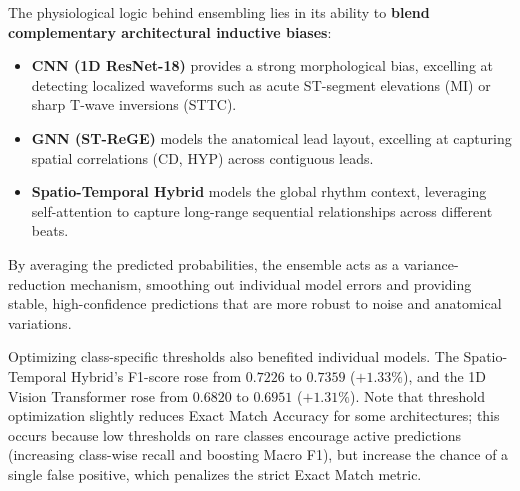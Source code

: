\documentclass[12pt,a4paper]{report}
\begin{document}
The physiological logic behind ensembling lies in its ability to \textbf{blend complementary architectural inductive biases}:
\begin{itemize}
    \item \textbf{CNN (1D ResNet-18)} provides a strong morphological bias, excelling at detecting localized waveforms such as acute ST-segment elevations (MI) or sharp T-wave inversions (STTC).
    \item \textbf{GNN (ST-ReGE)} models the anatomical lead layout, excelling at capturing spatial correlations (CD, HYP) across contiguous leads.
    \item \textbf{Spatio-Temporal Hybrid} models the global rhythm context, leveraging self-attention to capture long-range sequential relationships across different beats.
\end{itemize}
By averaging the predicted probabilities, the ensemble acts as a variance-reduction mechanism, smoothing out individual model errors and providing stable, high-confidence predictions that are more robust to noise and anatomical variations.

Optimizing class-specific thresholds also benefited individual models. The Spatio-Temporal Hybrid's F1-score rose from $0.7226$ to $0.7359$ ($+1.33\%$), and the 1D Vision Transformer rose from $0.6820$ to $0.6951$ ($+1.31\%$). Note that threshold optimization slightly reduces Exact Match Accuracy for some architectures; this occurs because low thresholds on rare classes encourage active predictions (increasing class-wise recall and boosting Macro F1), but increase the chance of a single false positive, which penalizes the strict Exact Match metric. 
\end{document}
